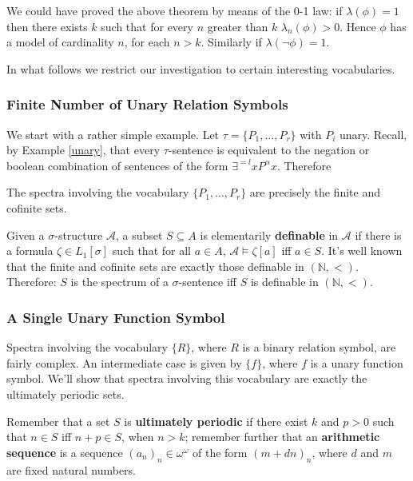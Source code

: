 We could have proved the above theorem by means of the 0-1 law: if $\lambda(\phi)=1$ then there exists $k$ such that for every $n$ greater than $k$ $\lambda_n(\phi)>0$.
Hence $\phi$ has a model of cardinality $n$, for each $n > k$. 
Similarly if $\lambda(\lnot \phi)=1$. 

In what follows we restrict our investigation to certain interesting vocabularies. 

\subsubsection{Finite Number of Unary Relation Symbols} 

We start with a rather simple example. 
Let $\tau=\{P_1, \ldots , P_r\}$ with $P_i$ unary. 
Recall, by Example \ref{unary}, that every $\tau$-sentence is equivalent to the negation or boolean combination of sentences of the form $\exists ^{=l} x P^{\alpha} x$. 
Therefore 

\begin{thm} 
The spectra involving the vocabulary $\{P_1, \ldots , P_r\}$ are precisely the finite and cofinite sets. 
\end{thm} 

\begin{rem} Given a $\sigma$-structure $\mathcal{A}$, a subset $S \subseteq A$ is elementarily \textbf{definable} in $\mathcal{A}$ if there is a formula $\zeta \in L_1[\sigma]$ such that for all $a \in A$, $\mathcal{A} \models \zeta[a] $ iff $a \in S$. 
It's well known that the finite and cofinite sets are exactly those definable in $(\mathbb{N}, <)$. 
Therefore: $S$ is the spectrum of a $\sigma$-sentence iff $S$ is definable in $(\mathbb{N}, <)$.
\end{rem}

\subsubsection{A Single Unary Function Symbol}
Spectra involving the vocabulary $\{R\}$, where $R$ is a binary relation symbol, are fairly complex. 
An intermediate case is given by $\{f\}$, where $f$ is a unary function symbol. 
We'll show that spectra involving this vocabulary are exactly the ultimately periodic sets. 

Remember that a set $S$  is \textbf{ultimately periodic} if there exist $k$ and $p >0$ such that $n \in S$ iff $n+p\in S$, when $n >k$; remember further that an \textbf{arithmetic sequence} is a sequence $(a_n)_n \in \omega^\omega$ of the form $(m+dn)_n$, where $d$ and $m$ are fixed natural numbers. 

